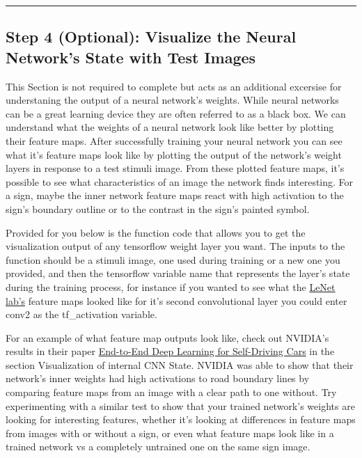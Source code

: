 \documentclass[11pt]{article}
\begin{document}
    \begin{center}\rule{0.5\linewidth}{\linethickness}\end{center}

\subsection{Step 4 (Optional): Visualize the Neural Network's State with
Test
Images}\label{step-4-optional-visualize-the-neural-networks-state-with-test-images}

This Section is not required to complete but acts as an additional
excersise for understaning the output of a neural network's weights.
While neural networks can be a great learning device they are often
referred to as a black box. We can understand what the weights of a
neural network look like better by plotting their feature maps. After
successfully training your neural network you can see what it's feature
maps look like by plotting the output of the network's weight layers in
response to a test stimuli image. From these plotted feature maps, it's
possible to see what characteristics of an image the network finds
interesting. For a sign, maybe the inner network feature maps react with
high activation to the sign's boundary outline or to the contrast in the
sign's painted symbol.

Provided for you below is the function code that allows you to get the
visualization output of any tensorflow weight layer you want. The inputs
to the function should be a stimuli image, one used during training or a
new one you provided, and then the tensorflow variable name that
represents the layer's state during the training process, for instance
if you wanted to see what the
\href{https://classroom.udacity.com/nanodegrees/nd013/parts/fbf77062-5703-404e-b60c-95b78b2f3f9e/modules/6df7ae49-c61c-4bb2-a23e-6527e69209ec/lessons/601ae704-1035-4287-8b11-e2c2716217ad/concepts/d4aca031-508f-4e0b-b493-e7b706120f81}{LeNet
lab's} feature maps looked like for it's second convolutional layer you
could enter conv2 as the tf\_activation variable.

For an example of what feature map outputs look like, check out NVIDIA's
results in their paper
\href{https://devblogs.nvidia.com/parallelforall/deep-learning-self-driving-cars/}{End-to-End
Deep Learning for Self-Driving Cars} in the section Visualization of
internal CNN State. NVIDIA was able to show that their network's inner
weights had high activations to road boundary lines by comparing feature
maps from an image with a clear path to one without. Try experimenting
with a similar test to show that your trained network's weights are
looking for interesting features, whether it's looking at differences in
feature maps from images with or without a sign, or even what feature
maps look like in a trained network vs a completely untrained one on the
same sign image.
\end{document}
